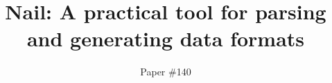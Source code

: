 \documentclass[10pt,twocolumn]{article}
\begin{document}
\author{Paper \#140}
\date{}
\title{Nail: A practical tool for parsing and generating data formats}

\maketitle










% 



\end{document}
